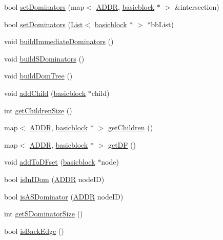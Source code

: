 \begin{DoxyCompactItemize}
\item 
bool \hyperlink{classbasicblock_a9e417b7d2b2cb87281b4c8ed1b10d566}{setDominators} (map$<$ \hyperlink{binaryTranslator_2global_8h_aa4557b0650cb21e57e3e4623410832c6}{ADDR}, \hyperlink{classbasicblock}{basicblock} $\ast$ $>$ \&intersection)
\item 
bool \hyperlink{classbasicblock_aafd371f1d5701ae15546178a153ca23d}{setDominators} (\hyperlink{classList}{List}$<$ \hyperlink{classbasicblock}{basicblock} $\ast$ $>$ $\ast$bbList)
\item 
void \hyperlink{classbasicblock_a668baef0263404790b8b03e336b96dda}{buildImmediateDominators} ()
\item 
void \hyperlink{classbasicblock_ad88c3d7891025016b9de9f3bfb2b3ddb}{buildSDominators} ()
\item 
void \hyperlink{classbasicblock_a8e7863ba06ca7f2418f1f423e6f71e8a}{buildDomTree} ()
\item 
void \hyperlink{classbasicblock_abb47633a30d4722992c2d961a4a4ad14}{addChild} (\hyperlink{classbasicblock}{basicblock} $\ast$child)
\item 
int \hyperlink{classbasicblock_a150ce672b4864265713b242b74b3ca30}{getChildrenSize} ()
\item 
map$<$ \hyperlink{binaryTranslator_2global_8h_aa4557b0650cb21e57e3e4623410832c6}{ADDR}, \hyperlink{classbasicblock}{basicblock} $\ast$ $>$ \hyperlink{classbasicblock_a6dde8501c965eb860dcc5bf63fcb06f2}{getChildren} ()
\item 
map$<$ \hyperlink{binaryTranslator_2global_8h_aa4557b0650cb21e57e3e4623410832c6}{ADDR}, \hyperlink{classbasicblock}{basicblock} $\ast$ $>$ \hyperlink{classbasicblock_a3f8fdaf67559becd35119c53a47791c6}{getDF} ()
\item 
void \hyperlink{classbasicblock_abfaebb9413fe26d42607c09949e9d5cb}{addToDFset} (\hyperlink{classbasicblock}{basicblock} $\ast$node)
\item 
bool \hyperlink{classbasicblock_a026b949adeca19875d0a8a43784d2c9d}{isInIDom} (\hyperlink{binaryTranslator_2global_8h_aa4557b0650cb21e57e3e4623410832c6}{ADDR} nodeID)
\item 
bool \hyperlink{classbasicblock_ab16dc9da49df4b6bf4c6573bfb31217a}{isASDominator} (\hyperlink{binaryTranslator_2global_8h_aa4557b0650cb21e57e3e4623410832c6}{ADDR} nodeID)
\item 
int \hyperlink{classbasicblock_ab3f5925d649492e0a3e73f4f9075ca7d}{getSDominatorSize} ()
\item 
bool \hyperlink{classbasicblock_a0da29a0f57618d2a13bfdfc9926319b9}{isBackEdge} ()

\end{DoxyCompactItemize}
